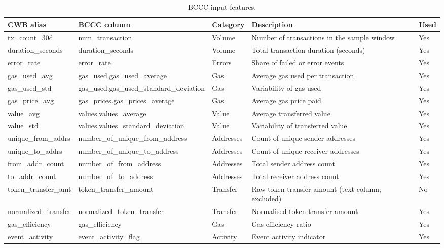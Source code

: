 \documentclass[12pt,a4paper]{report}
\newcommand{\tableheadcolor}{\rowcolor{TableHeadBg}}
\begin{document}
\begin{table}[H]
\centering
\caption[BCCC input features]{BCCC input features.}
\label{tab:bccc-dataset-features}
\footnotesize
\begin{tabular}{@{}p{2.4cm}p{3.6cm}p{2.0cm}p{4.8cm}p{1.0cm}@{}}
\toprule
\tableheadcolor
\textbf{CWB alias} & \textbf{BCCC column} & \textbf{Category} & \textbf{Description} & \textbf{Used} \\
\midrule
tx\_count\_30d & num\_transaction & Volume & Number of transactions in the sample window & Yes \\
duration\_seconds & duration\_seconds & Volume & Total transaction duration (seconds) & Yes \\
error\_rate & error\_rate & Errors & Share of failed or error events & Yes \\
gas\_used\_avg & gas\_used.gas\_used\_average & Gas & Average gas used per transaction & Yes \\
gas\_used\_std & gas\_used.gas\_used\_standard\_deviation & Gas & Variability of gas used & Yes \\
gas\_price\_avg & gas\_prices.gas\_prices\_average & Gas & Average gas price paid & Yes \\
value\_avg & values.values\_average & Value & Average transferred value & Yes \\
value\_std & values.values\_standard\_deviation & Value & Variability of transferred value & Yes \\
unique\_from\_addrs & number\_of\_unique\_from\_address & Addresses & Count of unique sender addresses & Yes \\
unique\_to\_addrs & number\_of\_unique\_to\_address & Addresses & Count of unique receiver addresses & Yes \\
from\_addr\_count & number\_of\_from\_address & Addresses & Total sender address count & Yes \\
to\_addr\_count & number\_of\_to\_address & Addresses & Total receiver address count & Yes \\
token\_transfer\_amt & token\_transfer\_amount & Transfer & Raw token transfer amount (text column; excluded) & No \\
normalized\_transfer & normalized\_token\_transfer & Transfer & Normalised token transfer amount & Yes \\
gas\_efficiency & gas\_efficiency & Gas & Gas efficiency ratio & Yes \\
event\_activity & event\_activity\_flag & Activity & Event activity indicator & Yes \\

\end{tabular}
\end{table}
\end{document}
